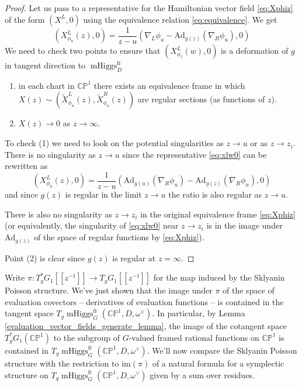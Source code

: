 \documentclass[11pt, oneside, reqno]{amsart}
\theoremstyle{definition} \newtheorem{definition}{Definition}[section]
\theoremstyle{definition} \newtheorem{remark}[definition]{Remark}
\theoremstyle{definition} \newtheorem{remarks}[definition]{Remarks}
\theoremstyle{definition} \newtheorem{question}[definition]{Question}
\theoremstyle{definition} \newtheorem*{note}{Note}
\theoremstyle{definition} \newtheorem{example}[definition]{Example}
\theoremstyle{definition} \newtheorem{examples}[definition]{Examples}
\newcommand{\bb}[1]{\mathbb{#1}}
\newcommand{\mr}[1]{\mathrm{#1}}
\DeclareMathOperator{\mhiggs}{mHiggs}
\newcommand{\fr}{\mathrm{fr}}
\newcommand{\Ad}{\mr{Ad}}
\begin{document}
\begin{proof}
  Let us pass to a representative for the Hamiltonian vector field \ref{eq:Xphiz} of the form $(X^{L}, 0)$ using the equivalence relation \ref{eq:equivalence}. We get
  \begin{equation}
\label{eq:xlw0}
(X^L_{\phi_u} (z) , 0) =  \frac{1}{z - u} (\nabla_{L} \phi_u  - \Ad_{g(z)} (\nabla_{R} \phi_{u}), 0 )
  \end{equation}
  We need to check two points to ensure that $(X^L_{\phi_z} (w) , 0)$ is a deformation
  of $g$ in tangent direction to $\mhiggs^{\fr}_{D}$
  \begin{enumerate}
  \item in each chart in $\bb{CP}^1$ there exists an equivalence frame in which $X(z) \sim (\tilde X_{\phi_{u}}^{L}(z), \tilde X_{\phi_{u}}^{R}(z))$  are regular sections (as functions of $z$).
  \item $X(z) \to 0$ as $z \to \infty$.
  \end{enumerate}

  To check (1) we need to look on the potential singularities as $z \to u$ or as $z \to z_i$.  There is no singularity as $z \to u$ since the representative \ref{eq:xlw0} can be rewritten as
  \begin{equation}
\label{eq:sklyanin-left}
(X^L_{\phi_u}(z) , 0)  =     \frac{1}{z - u} (\Ad_{g(u)}(\nabla_{R} \phi_u)  - \Ad_{g(z)} (\nabla_{R} \phi_{u}),0)
  \end{equation}
  and since $g(z)$ is regular in the limit $z \to u$ the ratio is also regular as $z \to u$.
  
  There is also no singularity as $z \to z_i$ in the original equivalence frame \ref{eq:Xphiz} (or equivalently, the singularity of \ref{eq:xlw0} near $z \to z_i$  is in the image under $\Ad_{g(z)}$ of the space of regular functions by \ref{eq:Xphiz}).
 
 Point (2) is clear since $g(z)$ is regular at $z = \infty$. 
\end{proof}

Write $\pi \colon T^*_g G_1[[z^{-1}]] \to T_g G_1[[z^{-1}]]$ for the map induced by the Sklyanin Poisson structure.  We've just shown that the image under $\pi$ of the space of evaluation covectors -- derivatives of evaluation functions -- is contained in the tangent space $T_{g}\mhiggs^\fr_G(\bb{CP}^1, D, \omega^\vee)$.  In particular, by Lemma \ref{evaluation_vector_fields_generate_lemma}, the image of the cotangent space $T^*_g G_1(\bb{CP}^1)$ to the subgroup of $G$-valued framed rational functions on $\bb{CP}^1$ is contained in $T_{g}\mhiggs^\fr_G(\bb{CP}^1, D, \omega^\vee)$.  We'll now compare the Sklyanin Poisson structure with the restriction to $\mr{im}(\pi)$ of a natural formula for a symplectic structure on $T_{g}\mhiggs^\fr_G(\bb{CP}^1, D, \omega^\vee)$ given by a sum over residues.
\end{document}
